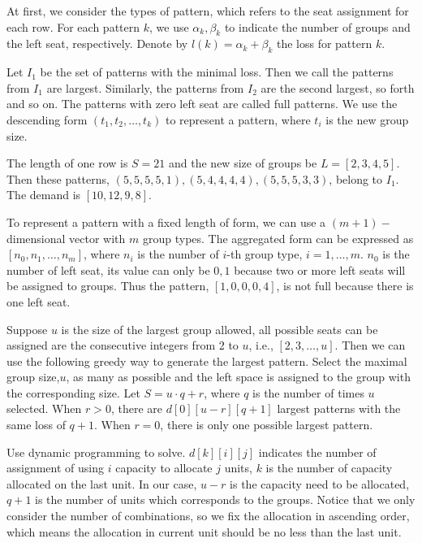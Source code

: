 At first, we consider the types of pattern, which refers to the seat assignment for each row. For each pattern $k$, we use $\alpha_k, \beta_k$ to indicate the number of groups and the left seat, respectively. Denote by $l(k) = \alpha_k + \beta_k$ the loss for pattern $k$.

Let $I_1$ be the set of patterns with the minimal loss. Then we call the patterns from $I_1$ are largest. Similarly, the patterns from $I_2$ are the second largest, so forth and so on. The patterns with zero left seat are called full patterns. We use the descending form $(t_1, t_2, \ldots, t_k)$ to represent a pattern, where $t_i$ is the new group size. 

\begin{example}\label{ex_largest}
  The length of one row is $S = 21$ and the new size of groups be $L = [2, 3, 4, 5]$. Then these patterns, $(5, 5, 5, 5, 1),(5, 4, 4, 4, 4),(5, 5, 5, 3, 3)$, belong to $I_1$. The demand is $[10, 12, 9, 8]$.
\end{example}

To represent a pattern with a fixed length of form, we can use a $(m+1)-$dimensional vector with $m$ group types. The aggregated form can be expressed as $[n_0, n_1, \ldots, n_m]$, where $n_i$ is the number of $i$-th group type, $i=1,\ldots,m$. 
$n_0$ is the number of left seat, its value can only be $0, 1$ because two or more left seats will be assigned to groups. Thus the pattern, $[1, 0, 0, 0, 4]$, is not full because there is one left seat.

Suppose $u$ is the size of the largest group allowed, all possible seats can be assigned are the consecutive integers from 2 to $u$, i.e., $[2,3,\ldots,u]$.
Then we can use the following greedy way to generate the largest pattern. Select the maximal group size,$u$, as many as possible and the left space is assigned to the group with the corresponding size. Let $S = u\cdot q + r$, where $q$ is the number of times $u$ selected. When $r>0$, there are $d[0][u-r][q+1]$ largest patterns with the same loss of $q+1$. When $r =0$, there is only one possible largest pattern.

Use dynamic programming to solve. $d[k][i][j]$ indicates the number of assignment of using $i$ capacity to allocate $j$ units, $k$ is the number of capacity allocated on the last unit. In our case, $u-r$ is the capacity need to be allocated, $q+1$ is the number of units which corresponds to the groups. Notice that we only consider the number of combinations, so we fix the allocation in ascending order, which means the allocation in current unit should be no less than the last unit.  

